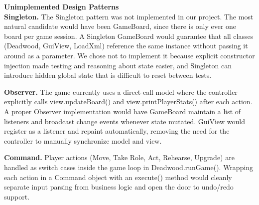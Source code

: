 \documentclass[12pt]{article}
\begin{document}
\textbf{Unimplemented Design Patterns}\\

\textbf{Singleton.}
The Singleton pattern was not implemented in our project. The most natural candidate would have been GameBoard, since there is only ever one board per game session. A Singleton GameBoard would guarantee that all classes (Deadwood, GuiView, LoadXml) reference the same instance without passing it around as a parameter. We chose not to implement it because explicit constructor injection made testing and reasoning about state easier, and Singleton can introduce hidden global state that is difficult to reset between tests.

\textbf{Observer.}
The game currently uses a direct-call model where the controller explicitly calls view.updateBoard() and view.printPlayerStats() after each action. A proper Observer implementation would have GameBoard maintain a list of listeners and broadcast change events whenever state mutated. GuiView would register as a listener and repaint automatically, removing the need for the controller to manually synchronize model and view.

\textbf{Command.}
Player actions (Move, Take Role, Act, Rehearse, Upgrade) are handled as switch cases inside the game loop in Deadwood.runGame(). Wrapping each action in a Command object with an execute() method would cleanly separate input parsing from business logic and open the door to undo/redo support.


\end{document}
